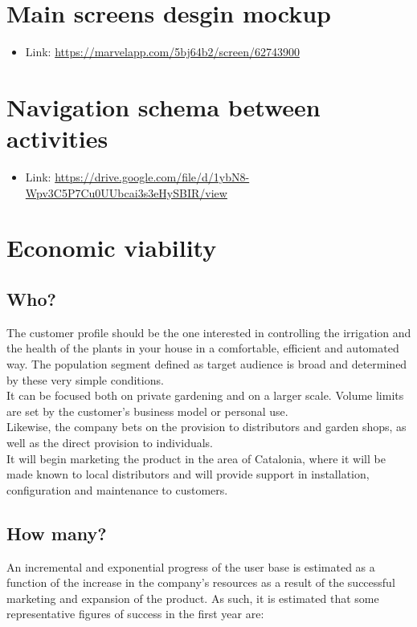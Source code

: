 \documentclass[11pt,a4paper]{article}
\begin{document}
\newpage

\section{Main screens desgin mockup}
\begin{itemize}
\item Link: \url{https://marvelapp.com/5bj64b2/screen/62743900}
\end{itemize}

\section{Navigation schema between activities}
\begin{itemize}
\item Link: \url{https://drive.google.com/file/d/1ybN8-Wpv3C5P7Cu0UUbcai3s3eHySBIR/view}
\end{itemize}

\section{Economic viability}
\subsection{Who?}
The customer profile should be the one interested in controlling the irrigation and the health of the plants in your house in a comfortable, efficient and automated way. The population segment defined as target audience is broad and determined by these very simple conditions. \\

It can be focused both on private gardening and on a larger scale. Volume limits are set by the customer's business model or personal use. \\

Likewise, the company bets on the provision to distributors and garden shops, as well as the direct provision to individuals.\\

It will begin marketing the product in the area of Catalonia, where it will be made known to local distributors and will provide support in installation, configuration and maintenance to customers. 
\subsection{How many?}
An incremental and exponential progress of the user base is estimated as a function of the increase in the company's resources as a result of the successful marketing and expansion of the product. As such, it is estimated that some representative figures of success in the first year are: 
\end{document}
